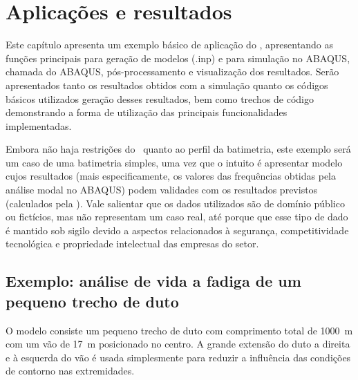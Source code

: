 \chapter{Aplicações e resultados\label{chap:aplicacoes}}

Este capítulo apresenta um exemplo básico de aplicação do \frame, apresentando as funções principais para geração de modelos (.inp) e para simulação no ABAQUS, chamada do ABAQUS, pós-processamento e visualização dos resultados. Serão apresentados tanto os resultados obtidos com a simulação quanto os códigos básicos utilizados geração desses resultados, bem como trechos de código demonstrando a forma de utilização das principais funcionalidades implementadas.

Embora não haja restrições do \frame\ quanto ao perfil da batimetria, este exemplo será um caso de uma batimetria simples, uma vez que o intuito é apresentar modelo cujos resultados (mais especificamente, os valores das frequências obtidas pela análise modal no ABAQUS) podem validades com os resultados previstos (calculados pela \fatfree).
Vale salientar que os dados utilizados são de domínio público ou fictícios, mas não representam um caso real, até porque que esse tipo de dado é mantido sob sigilo devido a aspectos relacionados à segurança, competitividade tecnológica e propriedade intelectual das empresas do setor.


\section{Exemplo: análise de vida a fadiga de um pequeno trecho de duto\label{sec:model-exemplo}}


O modelo consiste um pequeno trecho de duto com comprimento total de 1000~m com um vão de 17~m posicionado no centro. A grande extensão do duto a direita e à esquerda do vão é usada simplesmente para reduzir a influência das condições de contorno nas extremidades.

